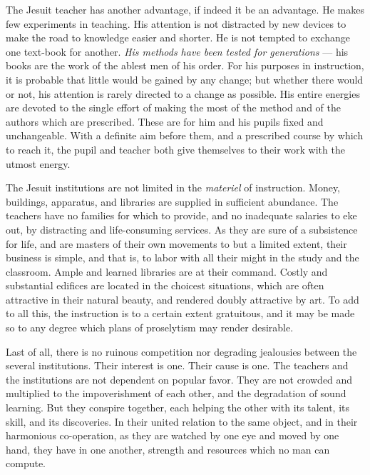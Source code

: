 \documentclass[]{book}
\begin{document}
The Jesuit teacher has another advantage, if indeed it be an advantage. He makes few experiments in teaching. His attention is not distracted by new devices to make the road to knowledge easier and shorter. He is not tempted to exchange one text-book for another. \emph{His methods have been tested for generations} --- his books are the work of the ablest men of his order. For his purposes in instruction, it is probable that little would be gained by any change; but whether there would or not, his attention is rarely directed to a change as possible. His entire energies are devoted to the single effort of making the most of the method and of the authors which are prescribed. These are for him and his pupils fixed and unchangeable. With a definite aim before them, and a prescribed course by which to reach it, the pupil and teacher both give themselves to their work with the utmost energy.

The Jesuit institutions are not limited in the \emph{materiel} of instruction. Money, buildings, apparatus, and libraries are supplied in sufficient abundance. The teachers have no families for which to provide, and no inadequate salaries to eke out, by distracting and life-consuming services. As they are sure of a subsistence for life, and are masters of their own movements to but a limited extent, their business is simple, and that is, to labor with all their might in the study and the classroom. Ample and learned libraries are at their command. Costly and substantial edifices are located in the choicest situations, which are often attractive in their natural beauty, and rendered doubly attractive by art. To add to all this, the instruction is to a certain extent gratuitous, and it may be made so to any degree which plans of proselytism may render desirable.

Last of all, there is no ruinous competition nor degrading jealousies between the several institutions. Their interest is one. Their cause is one. The teachers and the institutions are not dependent on popular favor. They are not crowded and multiplied to the impoverishment of each other, and the degradation of sound learning. But they conspire together, each helping the other with its talent, its skill, and its discoveries. In their united relation to the same object, and in their harmonious co-operation, as they are watched by one eye and moved by one hand, they have in one another, strength and resources which no man can compute.
\end{document}
